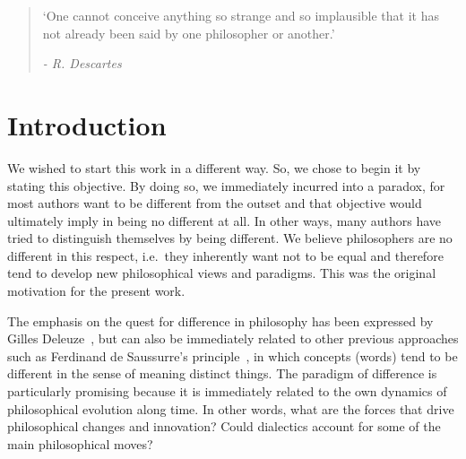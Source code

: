 \documentclass[%
 aip,
 jmp,%
 amsmath,amssymb,
 reprint,%
]{revtex4-1}
\begin{document}
\begin{quotation}
`One cannot conceive anything so strange and so implausible that it
has not already been said by one philosopher or another.'

\emph{- R. Descartes}
\end{quotation}


\section{\label{sec:level1}Introduction}

We wished to start this work in a different way. So, we chose to begin
it by stating this objective.  By doing so, we immediately incurred
into a paradox, for most authors want to be different from the outset
and that objective would ultimately imply in being no different at
all.  In other ways, many authors have tried to distinguish themselves
by being different.  We believe philosophers are no different in this
respect, i.e.\ they inherently want not to be equal and therefore tend
to develop new philosophical views and paradigms.  This was the
original motivation for the present work.

The emphasis on the quest for difference in philosophy has been
expressed by Gilles Deleuze~\cite{Deleuze}, but can also be
immediately related to other previous approaches such as Ferdinand de
Saussurre's principle~\cite{Saussure}, in which concepts (words) tend
to be different in the sense of meaning distinct things.  The paradigm
of difference is particularly promising because it is immediately
related to the own dynamics of philosophical evolution along time.  In
other words, what are the forces that drive philosophical changes and
innovation?  Could dialectics account for some of the main
philosophical moves?
\end{document}
